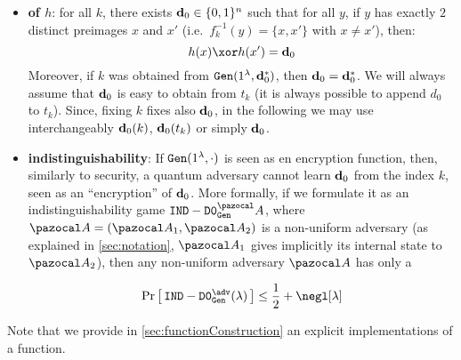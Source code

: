 \begin{definition}
\begin{itemize}
  \item \textbf{\XOR{} of $h$}: for all $k$, there exists $\mathbf{d}_0 \in \{0,1\}^n$ such that for all $y$, if $y$ has exactly $2$ distinct preimages $x$ and $x'$ (i.e.\ $f_k^{-1}(y) = \{x, x'\}$ with $x \neq x'$), then:
          \[h(x) \xor h(x') = \vect{d}_0\]
          Moreover, if $k$ was obtained from ${\tt Gen}(1^\lambda,\mathbf{d}_0^*)$, then $\mathbf{d}_0 = \mathbf{d}_0^*$. We will always assume that $\mathbf{d}_0$ is easy to obtain from $t_k$ (it is always possible to append $d_0$ to $t_k$). Since, fixing $k$ fixes also $\mathbf{d}_0$, in the following we may use interchangeably $\mathbf{d}_0(k)$, $\mathbf{d}_0(t_k)$ or simply $\mathbf{d}_0$.
    \item
          \begin{minipage}[t]{.55\textwidth}
            \textbf{indistinguishability}:
            If ${\tt Gen}(1^\lambda, \cdot)$ is seen as en encryption function, then, similarly to \indcpa{} security, a quantum adversary cannot learn $\mathbf{d}_0$ from the index $k$, seen as an ``encryption'' of $\mathbf{d}_0$. More formally, if we formulate it as an indistinguishability game $\INDFCT_\Gen^\cA$, where $\cA = (\cA_1,\cA_2)$ is a non-uniform \QPT{} adversary (as explained in \cref{sec:notation}, $\cA_1$ gives implicitly its internal state to $\cA_2$), then any non-uniform \QPT{} adversary $\cA$ has only a  %
          \end{minipage}\hfill%
          \begin{minipage}[t]{.35\textwidth}
            \begin {pcimage}\label{game:indfct}
              {\normalfont {}}
            \end{pcimage}%
          \end{minipage}
          \begin{align}
            \pr{\INDFCT_{\Gen{}}^{\adv}(\lambda)} \leq \frac{1}{2} + \negl[\lambda]
          \end{align}
  \end{itemize}
\end{definition}
Note that we provide in \cref{sec:functionConstruction} an explicit implementations of a \AssumpFct{} function.

